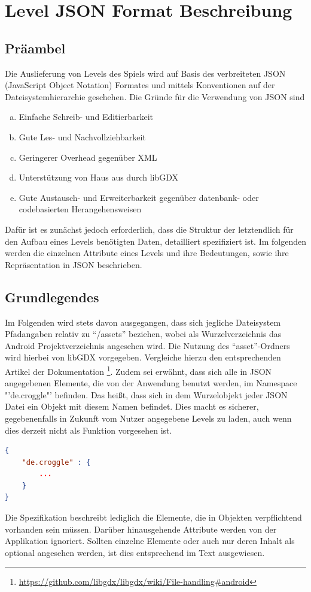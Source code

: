 \chapter{Level JSON Format Beschreibung}

\section{Präambel}
Die Auslieferung von Levels des Spiels wird auf Basis des verbreiteten JSON (JavaScript Object Notation) Formates und mittels Konventionen auf der Dateisystemhierarchie geschehen.
Die Gründe für die Verwendung von JSON sind
\begin{enumerate}[a)]
	\item Einfache Schreib- und Editierbarkeit
	\item Gute Les- und Nachvollziehbarkeit
	\item Geringerer Overhead gegenüber XML
	\item Unterstützung von Haus aus durch libGDX
	\item Gute Austausch- und Erweiterbarkeit gegenüber datenbank- oder codebasierten Herangehensweisen
\end{enumerate}
Dafür ist es zunächst jedoch erforderlich, dass die Struktur der letztendlich für den Aufbau eines Levels benötigten Daten, detailliert spezifiziert ist.
Im folgenden werden die einzelnen Attribute eines Levels und ihre Bedeutungen, sowie ihre Repräsentation in JSON beschrieben.

\section{Grundlegendes}
Im Folgenden wird stets davon ausgegangen, dass sich jegliche Dateisystem Pfadangaben relativ zu "`/assets"' beziehen, wobei als Wurzelverzeichnis das Android Projektverzeichnis angesehen wird.
Die Nutzung des "`asset"'-Ordners wird hierbei von libGDX vorgegeben.
Vergleiche hierzu den entsprechenden Artikel der Dokumentation \footnote{\url{https://github.com/libgdx/libgdx/wiki/File-handling\#android}}.
Zudem sei erwähnt, dass sich alle in JSON angegebenen Elemente, die von der Anwendung benutzt werden, im Namespace "'de.croggle"' befinden.
Das heißt, dass sich in dem Wurzelobjekt jeder JSON Datei ein Objekt mit diesem Namen befindet.
Dies macht es sicherer, gegebenenfalls in Zukunft vom Nutzer angegebene Levels zu laden, auch wenn dies derzeit nicht als Funktion vorgesehen ist.
\begin{lstlisting}[language=json,caption={Standardinhalt jeder JSON Datei der Anwendung}]
{
	"de.croggle" : {
		...
	}
}
\end{lstlisting}
Die Spezifikation beschreibt lediglich die Elemente, die in Objekten verpflichtend vorhanden sein müssen.
Darüber hinausgehende Attribute werden von der Applikation ignoriert.
Sollten einzelne Elemente oder auch nur deren Inhalt als optional angesehen werden, ist dies entsprechend im Text ausgewiesen.

